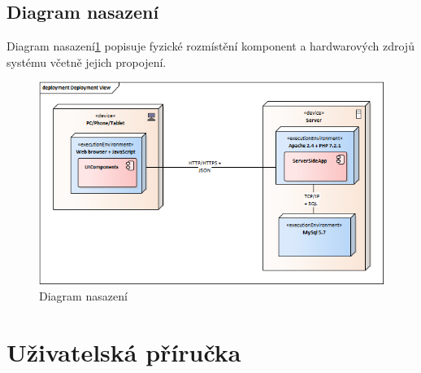 \documentclass[thesis=B,czech]{FITthesis}[2012/06/26]
\begin{document}
\subsection{Diagram nasazení}
	Diagram nasazení\ref{deployment_view} popisuje fyzické rozmístění komponent a hardwarových zdrojů systému včetně jejich propojení.\cite{si1_pred7}

\begin{figure}
	\includegraphics[width=\textwidth]{Deployment_view.png}
	\caption{Diagram nasazení}\label{deployment_view}
\end{figure}

\section{Uživatelská příručka}
\end{document}
